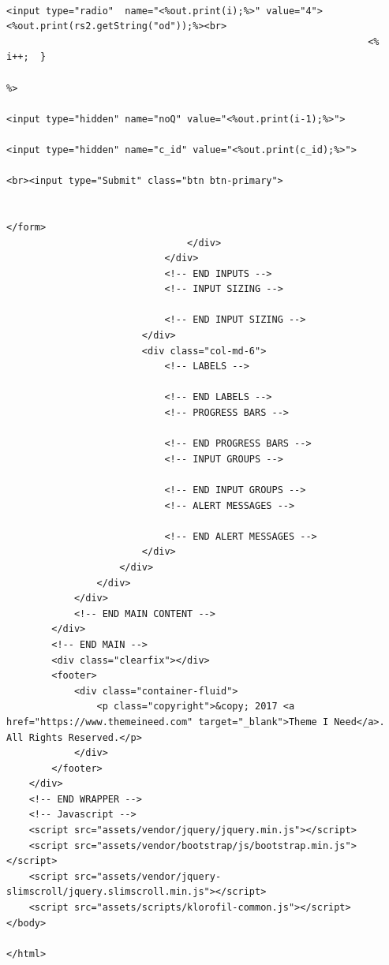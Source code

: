 \begin{lstlisting}
                                                                           <input type="radio"  name="<%out.print(i);%>" value="4"><%out.print(rs2.getString("od"));%><br>
                                                                <%       i++;  }
                                                                             %>           
                                                                             <input type="hidden" name="noQ" value="<%out.print(i-1);%>">
                                                                             <input type="hidden" name="c_id" value="<%out.print(c_id);%>">
                                                                             <br><input type="Submit" class="btn btn-primary">
									
                                                                    </form>
								</div>
							</div>
							<!-- END INPUTS -->
							<!-- INPUT SIZING -->
							
							<!-- END INPUT SIZING -->
						</div>
						<div class="col-md-6">
							<!-- LABELS -->
							
							<!-- END LABELS -->
							<!-- PROGRESS BARS -->
							
							<!-- END PROGRESS BARS -->
							<!-- INPUT GROUPS -->
						
							<!-- END INPUT GROUPS -->
							<!-- ALERT MESSAGES -->
							
							<!-- END ALERT MESSAGES -->
						</div>
					</div>
				</div>
			</div>
			<!-- END MAIN CONTENT -->
		</div>
		<!-- END MAIN -->
		<div class="clearfix"></div>
		<footer>
			<div class="container-fluid">
				<p class="copyright">&copy; 2017 <a href="https://www.themeineed.com" target="_blank">Theme I Need</a>. All Rights Reserved.</p>
			</div>
		</footer>
	</div>
	<!-- END WRAPPER -->
	<!-- Javascript -->
	<script src="assets/vendor/jquery/jquery.min.js"></script>
	<script src="assets/vendor/bootstrap/js/bootstrap.min.js"></script>
	<script src="assets/vendor/jquery-slimscroll/jquery.slimscroll.min.js"></script>
	<script src="assets/scripts/klorofil-common.js"></script>
</body>

</html>

\end{lstlisting}

